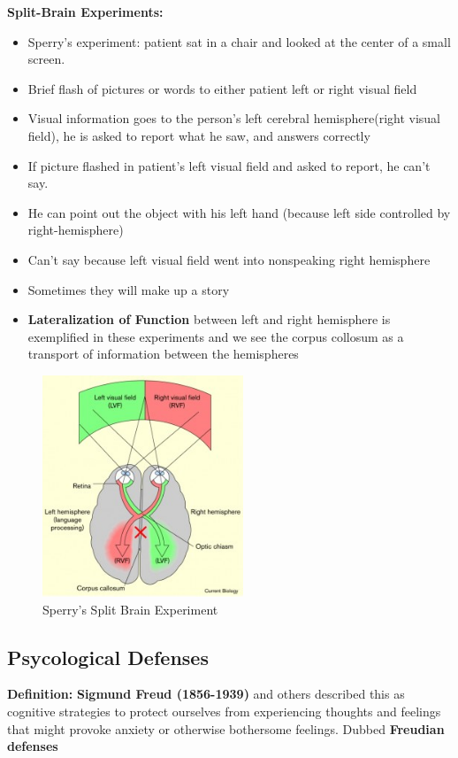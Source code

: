 \documentclass{article}
\begin{document}
\noindent \textbf{Split-Brain Experiments:}
\begin{itemize}
    \item Sperry's experiment: patient sat in a chair and looked at the center of a small screen. 
    \item Brief flash of pictures or words to either patient left or right visual field
    \item Visual information goes to the person's left cerebral hemisphere(right visual field), he is asked to report what he saw, and answers correctly
    \item If picture flashed in patient's left visual field and asked to report, he can't say. 
    \item He can point out the object with his left hand (because left side controlled by right-hemisphere)
    \item Can't say because left visual field went into nonspeaking right hemisphere
    \item Sometimes they will make up a story
    \item \textbf{Lateralization of Function} between left and right hemisphere is exemplified in these experiments and we see the corpus collosum as a transport of information between the hemispheres
\end{itemize}

\begin{figure}[htp]
\centering
\includegraphics[width= 6cm]{images/split-brain-Sperry.jpg}
\caption{Sperry's Split Brain Experiment}
\label{fig: split-brain}
\end{figure}

\newpage
\subsection{Psycological Defenses}
\textbf{Definition:} \textbf{Sigmund Freud (1856-1939)} and others described this as cognitive strategies to protect ourselves from experiencing thoughts and feelings that might provoke anxiety or otherwise bothersome feelings. Dubbed \textbf{Freudian defenses} \\
\end{document}
